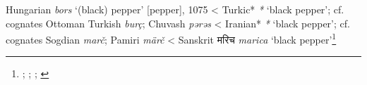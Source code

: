 \begin{etymology}\label{ety:bors}
Hungarian \textit{bors} `(black) pepper' [pepper], 1075
< Turkic* \textit{*} `black pepper'; cf. cognates Ottoman Turkish \textit{burç}; Chuvash \textit{pərəs}
< Iranian* \textit{*} `black pepper'; cf. cognates Sogdian \textit{marč}; Pamiri \textit{märč}
< Sanskrit {मरिच} \textit{marica} `black pepper'\footnote{\textcite{zaicz_etimologiai_2006}; \textcite{zaicz_etimologiai_2006}; \textcite{zaicz_etimologiai_2006}; \textcite[790]{monier-williams_sanskrit-english_1899}}
\end{etymology}